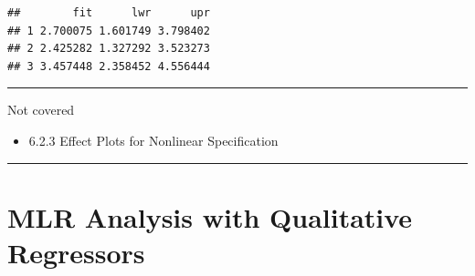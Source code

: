 \documentclass[]{book}
\newenvironment{Shaded}{\begin{snugshade}}{\end{snugshade}}
\newcommand{\CommentTok}[1]{\textcolor[rgb]{0.56,0.35,0.01}{\textit{#1}}}
\newcommand{\DataTypeTok}[1]{\textcolor[rgb]{0.13,0.29,0.53}{#1}}
\newcommand{\DecValTok}[1]{\textcolor[rgb]{0.00,0.00,0.81}{#1}}
\newcommand{\KeywordTok}[1]{\textcolor[rgb]{0.13,0.29,0.53}{\textbf{#1}}}
\newcommand{\NormalTok}[1]{#1}
\newcommand{\OperatorTok}[1]{\textcolor[rgb]{0.81,0.36,0.00}{\textbf{#1}}}
\newcommand{\StringTok}[1]{\textcolor[rgb]{0.31,0.60,0.02}{#1}}
\providecommand{\tightlist}{%
  \setlength{\itemsep}{0pt}\setlength{\parskip}{0pt}}
\begin{document}
\begin{Shaded}
\end{Shaded}

\begin{verbatim}
##        fit      lwr      upr
## 1 2.700075 1.601749 3.798402
## 2 2.425282 1.327292 3.523273
## 3 3.457448 2.358452 4.556444
\end{verbatim}

\begin{center}\rule{0.5\linewidth}{\linethickness}\end{center}

Not covered

\begin{itemize}
\tightlist
\item
  6.2.3 Effect Plots for Nonlinear Specification
\end{itemize}

\begin{center}\rule{0.5\linewidth}{\linethickness}\end{center}

\hypertarget{mlr-analysis-with-qualitative-regressors}{%
\section{MLR Analysis with Qualitative
Regressors}\label{mlr-analysis-with-qualitative-regressors}}
\end{document}
